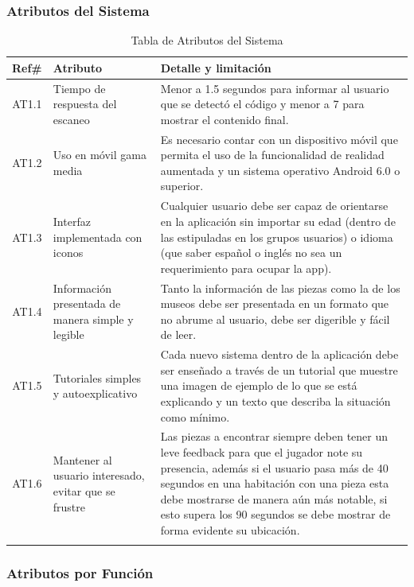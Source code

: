 \subsubsection{Atributos del Sistema}

\begin{longtable}{|c|p{3.5cm}|p{10cm}|}
\hline 
Ref\# & Atributo & Detalle y limitación \\ 
\hline 
AT1.1 & Tiempo de respuesta del escaneo & Menor a 1.5 segundos para informar al usuario que se detectó el código y menor a 7 para mostrar el contenido final.  \\ 
\hline 
AT1.2 & Uso en móvil gama media & Es necesario contar con un dispositivo móvil que permita el uso de la funcionalidad de realidad aumentada y un sistema operativo Android 6.0 o superior. \\ 
\hline
AT1.3 & Interfaz implementada con iconos & Cualquier usuario debe ser capaz de orientarse en la aplicación sin importar su edad (dentro de las estipuladas en los grupos usuarios) o idioma (que saber español o inglés no sea un requerimiento para ocupar la app).  \\ 
\hline
AT1.4 & Información presentada de manera simple y legible & Tanto la información de las piezas como la de los museos debe ser presentada en un formato que no abrume al usuario, debe ser digerible y fácil de leer.  \\ 
\hline
AT1.5 & Tutoriales simples y autoexplicativo & Cada nuevo sistema dentro de la aplicación debe ser enseñado a través de un tutorial que muestre una imagen de ejemplo de lo que se está explicando y un texto que describa la situación como mínimo.	\\ 
\hline
AT1.6 & Mantener al usuario interesado, evitar que se frustre & Las piezas a encontrar  siempre deben tener un leve feedback para que el jugador note su presencia, además si el usuario pasa más de 40 segundos en una habitación con una pieza esta debe mostrarse de manera aún más notable, si esto supera los 90 segundos se debe mostrar de forma evidente su ubicación.  \\ 
\hline	
\caption{Tabla de Atributos del Sistema}
\label{tab19}\\
\end{longtable}

\subsubsection{Atributos por Función}

